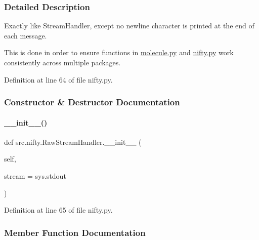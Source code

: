 \subsubsection{Detailed Description}
Exactly like Stream\+Handler, except no newline character is printed at the end of each message. 

This is done in order to ensure functions in \hyperlink{molecule_8py}{molecule.\+py} and \hyperlink{nifty_8py}{nifty.\+py} work consistently across multiple packages. 

Definition at line 64 of file nifty.\+py.



\subsubsection{Constructor \& Destructor Documentation}
\mbox{\label{classsrc_1_1nifty_1_1RawStreamHandler_a04b9225002425fea4f0614f9e032490c}} 
\paragraph{\texorpdfstring{\+\_\+\+\_\+init\+\_\+\+\_\+()}{\_\_init\_\_()}}
{\footnotesize\ttfamily def src.\+nifty.\+Raw\+Stream\+Handler.\+\_\+\+\_\+init\+\_\+\+\_\+ (\begin{DoxyParamCaption}\item[{}]{self,  }\item[{}]{stream = {\ttfamily sys.stdout} }\end{DoxyParamCaption})}



Definition at line 65 of file nifty.\+py.



\subsubsection{Member Function Documentation}
\mbox{\label{classsrc_1_1nifty_1_1RawStreamHandler_ae914fe58b48693de2156e85a730ef81f}} 
